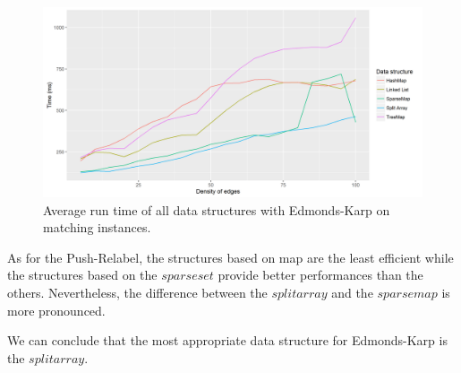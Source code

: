 \begin{figure}[H]
\begin{center}
\includegraphics[scale=0.5]{images/results/ekmeanmatching.png}
\caption{Average run time of all data structures with Edmonds-Karp on matching instances.}
\label{fig:ekmeanmatching}
\end{center}
\end{figure}
As for the Push-Relabel, the structures based on map are the least efficient while the structures based on the $sparse set$ provide better performances than the others. Nevertheless, the difference between the $split array$ and the $sparse map$ is more pronounced. 

We can conclude that the most appropriate data structure for Edmonds-Karp is the $split array$.
